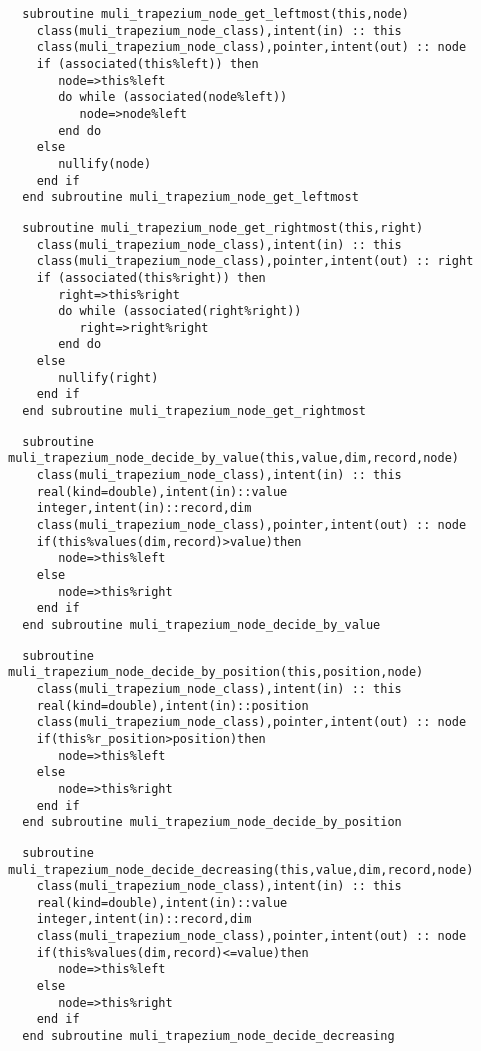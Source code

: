 \begin{Verbatim}
  subroutine muli_trapezium_node_get_leftmost(this,node)
    class(muli_trapezium_node_class),intent(in) :: this
    class(muli_trapezium_node_class),pointer,intent(out) :: node
    if (associated(this%left)) then
       node=>this%left
       do while (associated(node%left))
          node=>node%left
       end do
    else
       nullify(node)
    end if
  end subroutine muli_trapezium_node_get_leftmost
\end{Verbatim}

\begin{Verbatim}
  subroutine muli_trapezium_node_get_rightmost(this,right)
    class(muli_trapezium_node_class),intent(in) :: this
    class(muli_trapezium_node_class),pointer,intent(out) :: right
    if (associated(this%right)) then
       right=>this%right
       do while (associated(right%right))
          right=>right%right
       end do
    else
       nullify(right)
    end if
  end subroutine muli_trapezium_node_get_rightmost
\end{Verbatim}

\begin{Verbatim}
  subroutine muli_trapezium_node_decide_by_value(this,value,dim,record,node)
    class(muli_trapezium_node_class),intent(in) :: this
    real(kind=double),intent(in)::value
    integer,intent(in)::record,dim
    class(muli_trapezium_node_class),pointer,intent(out) :: node
    if(this%values(dim,record)>value)then
       node=>this%left
    else
       node=>this%right
    end if
  end subroutine muli_trapezium_node_decide_by_value
\end{Verbatim}

\begin{Verbatim}
  subroutine muli_trapezium_node_decide_by_position(this,position,node)
    class(muli_trapezium_node_class),intent(in) :: this
    real(kind=double),intent(in)::position
    class(muli_trapezium_node_class),pointer,intent(out) :: node
    if(this%r_position>position)then
       node=>this%left
    else
       node=>this%right
    end if
  end subroutine muli_trapezium_node_decide_by_position
\end{Verbatim}

\begin{Verbatim}
  subroutine muli_trapezium_node_decide_decreasing(this,value,dim,record,node)
    class(muli_trapezium_node_class),intent(in) :: this
    real(kind=double),intent(in)::value
    integer,intent(in)::record,dim
    class(muli_trapezium_node_class),pointer,intent(out) :: node
    if(this%values(dim,record)<=value)then
       node=>this%left
    else
       node=>this%right
    end if
  end subroutine muli_trapezium_node_decide_decreasing
\end{Verbatim}

